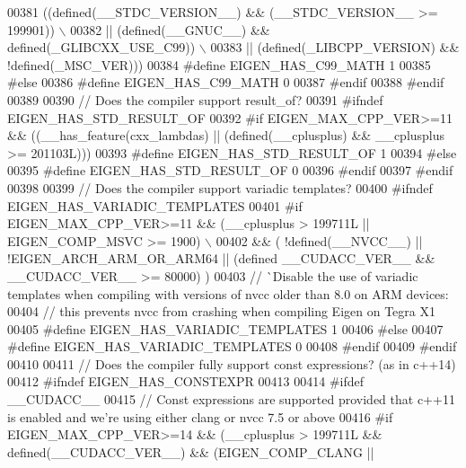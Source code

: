 \begin{DoxyCode}
00381 \textcolor{preprocessor}{    ((defined(\_\_STDC\_VERSION\_\_) && (\_\_STDC\_VERSION\_\_ >= 199901))       \(\backslash\)}
00382 \textcolor{preprocessor}{  || (defined(\_\_GNUC\_\_) && defined(\_GLIBCXX\_USE\_C99)) \(\backslash\)}
00383 \textcolor{preprocessor}{  || (defined(\_LIBCPP\_VERSION) && !defined(\_MSC\_VER)))}
00384 \textcolor{preprocessor}{  #define EIGEN\_HAS\_C99\_MATH 1}
00385 \textcolor{preprocessor}{#else}
00386 \textcolor{preprocessor}{  #define EIGEN\_HAS\_C99\_MATH 0}
00387 \textcolor{preprocessor}{#endif}
00388 \textcolor{preprocessor}{#endif}
00389 
00390 \textcolor{comment}{// Does the compiler support result\_of?}
00391 \textcolor{preprocessor}{#ifndef EIGEN\_HAS\_STD\_RESULT\_OF}
00392 \textcolor{preprocessor}{#if EIGEN\_MAX\_CPP\_VER>=11 && ((\_\_has\_feature(cxx\_lambdas) || (defined(\_\_cplusplus) && \_\_cplusplus >=
       201103L)))}
00393 \textcolor{preprocessor}{#define EIGEN\_HAS\_STD\_RESULT\_OF 1}
00394 \textcolor{preprocessor}{#else}
00395 \textcolor{preprocessor}{#define EIGEN\_HAS\_STD\_RESULT\_OF 0}
00396 \textcolor{preprocessor}{#endif}
00397 \textcolor{preprocessor}{#endif}
00398 
00399 \textcolor{comment}{// Does the compiler support variadic templates?}
00400 \textcolor{preprocessor}{#ifndef EIGEN\_HAS\_VARIADIC\_TEMPLATES}
00401 \textcolor{preprocessor}{#if EIGEN\_MAX\_CPP\_VER>=11 && (\_\_cplusplus > 199711L || EIGEN\_COMP\_MSVC >= 1900) \(\backslash\)}
00402 \textcolor{preprocessor}{  && ( !defined(\_\_NVCC\_\_) || !EIGEN\_ARCH\_ARM\_OR\_ARM64 || (defined \_\_CUDACC\_VER\_\_ && \_\_CUDACC\_VER\_\_ >=
       80000) )}
00403     \textcolor{comment}{// ^^ Disable the use of variadic templates when compiling with versions of nvcc older than 8.0 on ARM
       devices:}
00404     \textcolor{comment}{//    this prevents nvcc from crashing when compiling Eigen on Tegra X1}
00405 \textcolor{preprocessor}{#define EIGEN\_HAS\_VARIADIC\_TEMPLATES 1}
00406 \textcolor{preprocessor}{#else}
00407 \textcolor{preprocessor}{#define EIGEN\_HAS\_VARIADIC\_TEMPLATES 0}
00408 \textcolor{preprocessor}{#endif}
00409 \textcolor{preprocessor}{#endif}
00410 
00411 \textcolor{comment}{// Does the compiler fully support const expressions? (as in c++14)}
00412 \textcolor{preprocessor}{#ifndef EIGEN\_HAS\_CONSTEXPR}
00413 
00414 \textcolor{preprocessor}{#ifdef \_\_CUDACC\_\_}
00415 \textcolor{comment}{// Const expressions are supported provided that c++11 is enabled and we're using either clang or nvcc 7.5
       or above}
00416 \textcolor{preprocessor}{#if EIGEN\_MAX\_CPP\_VER>=14 && (\_\_cplusplus > 199711L && defined(\_\_CUDACC\_VER\_\_) && (EIGEN\_COMP\_CLANG ||
}
\end{DoxyCode}
